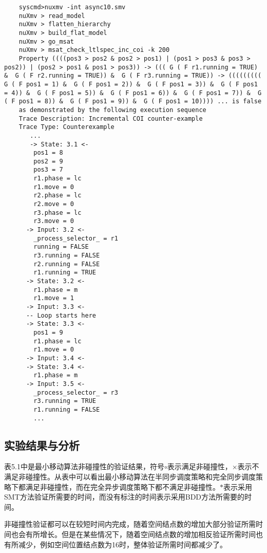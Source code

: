 \begin{lstlisting}
    syscmd>nuxmv -int async10.smv
    nuXmv > read_model
    nuXmv > flatten_hierarchy
    nuXmv > build_flat_model
    nuXmv > go_msat
    nuXmv > msat_check_ltlspec_inc_coi -k 200
    Property ((((pos3 > pos2 & pos2 > pos1) | (pos1 > pos3 & pos3 > pos2)) | (pos2 > pos1 & pos1 > pos3)) -> ((( G ( F r1.running = TRUE) &  G ( F r2.running = TRUE)) &  G ( F r3.running = TRUE)) -> ((((((((( G ( F pos1 = 1) &  G ( F pos1 = 2)) &  G ( F pos1 = 3)) &  G ( F pos1 = 4)) &  G ( F pos1 = 5)) &  G ( F pos1 = 6)) &  G ( F pos1 = 7)) &  G ( F pos1 = 8)) &  G ( F pos1 = 9)) &  G ( F pos1 = 10)))) ... is false
    as demonstrated by the following execution sequence
    Trace Description: Incremental COI counter-example
    Trace Type: Counterexample
       ...
       -> State: 3.1 <-
        pos1 = 8
        pos2 = 9
        pos3 = 7
        r1.phase = lc
        r1.move = 0
        r2.phase = lc
        r2.move = 0
        r3.phase = lc
        r3.move = 0
      -> Input: 3.2 <-
        _process_selector_ = r1
        running = FALSE
        r3.running = FALSE
        r2.running = FALSE
        r1.running = TRUE
      -> State: 3.2 <-
        r1.phase = m
        r1.move = 1
      -> Input: 3.3 <-
      -- Loop starts here
      -> State: 3.3 <-
        pos1 = 9
        r1.phase = lc
        r1.move = 0
      -> Input: 3.4 <-
      -> State: 3.4 <-
        r1.phase = m
      -> Input: 3.5 <-
        _process_selector_ = r3
        r3.running = TRUE
        r1.running = FALSE
        ...
\end{lstlisting}

\subsection{实验结果与分析}

表5.1中是最小移动算法非碰撞性的验证结果，符号$\circ$表示满足非碰撞性，$\times$表示不满足非碰撞性。从表中可以看出最小移动算法在半同步调度策略和完全同步调度策略下都满足非碰撞性，而在完全异步调度策略下都不满足非碰撞性。$\ast$表示采用SMT方法验证所需要的时间，而没有标注的时间表示采用BDD方法所需要的时间。

非碰撞性验证都可以在较短时间内完成，随着空间结点数的增加大部分验证所需时间也会有所增长。但是在某些情况下，随着空间结点数的增加相反验证所需时间也有所减少，例如空间位置结点数为16时，整体验证所需时间都减少了。

